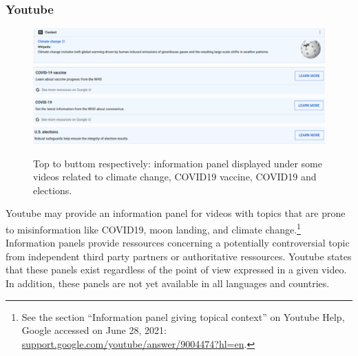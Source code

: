 \documentclass{article}
\begin{document}
\subsubsection{Youtube}

\begin{figure}
	\centering
		\includegraphics[scale=0.3]{./img/youtube_panels/yt_1.png} 
		\includegraphics[scale=0.3]{./img/youtube_panels/yt_2.png} 
		\includegraphics[scale=0.3]{./img/youtube_panels/yt_3.png}
		\includegraphics[scale=0.3]{./img/youtube_panels/yt_4.png} 
	\caption{Top to buttom respectively: information panel displayed under some videos related to climate change, COVID19 vaccine, COVID19 and elections.}
	\label{fig9}
\end{figure}

Youtube may provide an information panel for videos with topics that are prone to misinformation like COVID19, moon landing, and climate change.\footnote{See the section ``Information panel giving topical context'' on Youtube Help, Google accessed on June 28, 2021: \href{https://support.google.com/youtube/answer/9004474?hl=en}{support.google.com/youtube/answer/9004474?hl=en}.} Information panels provide ressources concerning a potentially controversial topic from independent third party partners or authoritative ressources. Youtube states that these panels exist regardless of the point of view expressed in a given video. In addition, these panels are not yet available in all languages and countries. %
\end{document}
